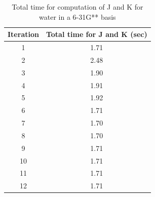 \documentclass[12pt,a4paper,english]{beamer}
\begin{document}

%
\begin{frame}
        \begin{table}
                \centering
                \begin{tabular}{|c|c|}
                         Iteration & Total time for J and K (sec) \\
\hline
                         1 &  1.71\\ 
                         2 &  2.48\\ 
                         3 &  1.90\\ 
                         4 &  1.91\\ 
                         5 &  1.92\\ 
                         6 &  1.71\\ 
                         7 &  1.70\\ 
                         8 &  1.70\\ 
                         9 &  1.71\\ 
                        10 &  1.71\\ 
                        11 &  1.71\\ 
                        12 &  1.71\\ 
\hline
                \end{tabular}
                \caption{Total time for computation of J and K for water in a 6-31G** basis}
                \label{tab:1}
        \end{table}
\end{frame}
\end{document}
